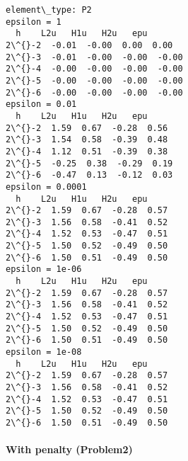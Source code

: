 \documentclass[11pt]{article}
\begin{document}
    \begin{Verbatim}[commandchars=\\\{\}]
element\_type: P2
epsilon = 1
  h    L2u   H1u   H2u   epu
2\^{}-2  -0.01  -0.00  0.00  0.00
2\^{}-3  -0.01  -0.00  -0.00  -0.00
2\^{}-4  -0.00  -0.00  -0.00  -0.00
2\^{}-5  -0.00  -0.00  -0.00  -0.00
2\^{}-6  -0.00  -0.00  -0.00  -0.00
epsilon = 0.01
  h    L2u   H1u   H2u   epu
2\^{}-2  1.59  0.67  -0.28  0.56
2\^{}-3  1.54  0.58  -0.39  0.48
2\^{}-4  1.12  0.51  -0.39  0.38
2\^{}-5  -0.25  0.38  -0.29  0.19
2\^{}-6  -0.47  0.13  -0.12  0.03
epsilon = 0.0001
  h    L2u   H1u   H2u   epu
2\^{}-2  1.59  0.67  -0.28  0.57
2\^{}-3  1.56  0.58  -0.41  0.52
2\^{}-4  1.52  0.53  -0.47  0.51
2\^{}-5  1.50  0.52  -0.49  0.50
2\^{}-6  1.50  0.51  -0.49  0.50
epsilon = 1e-06
  h    L2u   H1u   H2u   epu
2\^{}-2  1.59  0.67  -0.28  0.57
2\^{}-3  1.56  0.58  -0.41  0.52
2\^{}-4  1.52  0.53  -0.47  0.51
2\^{}-5  1.50  0.52  -0.49  0.50
2\^{}-6  1.50  0.51  -0.49  0.50
epsilon = 1e-08
  h    L2u   H1u   H2u   epu
2\^{}-2  1.59  0.67  -0.28  0.57
2\^{}-3  1.56  0.58  -0.41  0.52
2\^{}-4  1.52  0.53  -0.47  0.51
2\^{}-5  1.50  0.52  -0.49  0.50
2\^{}-6  1.50  0.51  -0.49  0.50
    \end{Verbatim}

    \paragraph{With penalty (Problem2)}\label{with-penalty-problem2}
\end{document}
